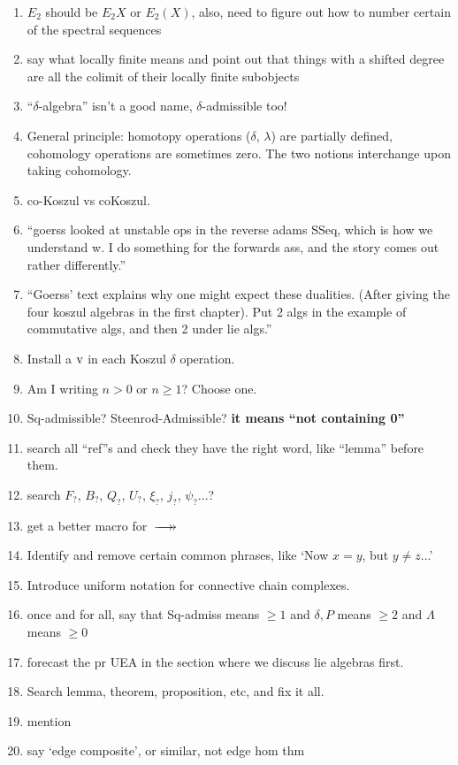 \documentclass[11pt]{amsart}
\theoremstyle{plain}
\theoremstyle{definition}
\renewcommand{\to}{\longrightarrow}
\theoremstyle{plain}
\newcommand{\epi}{{\,\makebox[0cm][l]{\ensuremath\to}\to}}
\newcommand{\Sq}{\mathrm{Sq}}
\begin{document}
\begin{todolist}
\begin{enumerate}
\item $E_2$ should be $E_2X$ or $E_2(X)$, also, need to figure out how to number certain of the spectral sequences
\item say what locally finite means and point out that things with a shifted degree are all the colimit of their locally finite subobjects
\item ``$\delta$-algebra'' isn't a good name, $\delta$-admissible too!
\item General principle: homotopy operations ($\delta$, $\lambda$) are partially defined, cohomology operations are sometimes zero. The two notions interchange upon taking cohomology.
\item co-Koszul vs coKoszul.
\item ``goerss looked at unstable ops in the reverse adams SSeq, which is how we understand w. I do something for the forwards ass, and the story comes out rather differently.''
\item 
``Goerss' text explains why one might expect these dualities. (After giving the four koszul algebras in the first chapter). Put 2 algs in the example of commutative algs, and then 2 under lie algs.''
\item Install a $\textup{v}$ in each Koszul $\delta$ operation.
\item Am I writing $n>0$ or $n\geq1$? Choose one.
\item $\Sq$-admissible? Steenrod-Admissible? \textbf{it means ``not containing 0''}
\item search all ``ref''s and check they have the right word, like ``lemma'' before them.
\item search $F_?$, $B_?$, $Q_?$, $U_?$, $\xi_?$, $j_?$, $\psi_?$...?
\item get a better macro for $\epi$
\item Identify and remove certain common phrases, like `Now $x=y$, but $y\neq z$...'
\item Introduce uniform notation for connective chain complexes.
\item once and for all, say that Sq-admiss means $\geq1$ and $\delta,P$ means $\geq2$ and $\Lambda$ means $\geq0$
\item forecast the pr UEA in the section where we discuss lie algebras first.
\item Search lemma, theorem, proposition, etc, and fix it all.
\item mention %
\item say `edge composite', or similar, not edge hom thm

\end{enumerate}
\end{todolist}
\end{document}

